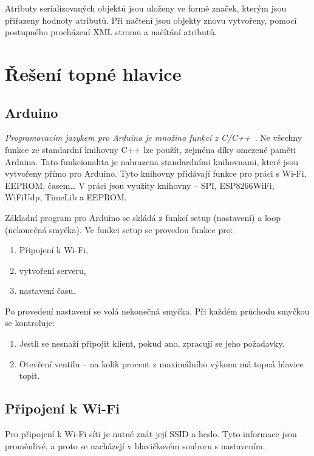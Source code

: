 \documentclass[thesis=B,czech]{FITthesis}[2012/10/20]
\begin{document}
Atributy serializovaných objektů jsou uloženy ve formě značek, kterým jsou přiřazeny hodnoty atributů. Při načtení jsou objekty znovu vytvořeny, pomocí postupného procházení XML stromu a načítání atributů. 

\chapter{Řešení topné hlavice}

\section{Arduino}
\textit{Programovacím jazykem pro Arduino je množina funkcí z C/C++}~\cite{ardFAQ}. Ne všechny funkce ze standardní knihovny C++ lze použít, zejména díky omezené paměti Arduina. Tato funkcionalita je nahrazena standardními knihovnami, které jsou vytvořeny přímo pro Arduino. Tyto knihovny přidávají funkce pro práci s Wi-Fi, EEPROM, časem… V práci jsou využity knihovny – SPI, ESP8266WiFi, WiFiUdp, TimeLib a EEPROM.

Základní program pro Arduino se skládá z funkcí setup (nastavení) a loop (nekonečná smyčka). Ve funkci setup se provedou funkce pro:

\begin{enumerate}

\item Připojení k Wi-Fi,
\item vytvoření serveru,
\item nastavení času.

\end{enumerate}

Po provedení nastavení se volá nekonečná smyčka. Při každém průchodu smyčkou se kontroluje:

\begin{enumerate}

\item Jestli se nesnaží připojit klient, pokud ano, zpracují se jeho požadavky.
\item Otevření ventilu – na kolik procent z maximálního výkonu má topná hlavice topit.

\end{enumerate}

\section{Připojení k Wi-Fi}

Pro připojení k Wi-Fi síti je nutné znát její SSID a heslo. Tyto informace jsou proměnlivé, a proto se nacházejí v hlavičkovém souboru s nastavením. 
\end{document}
